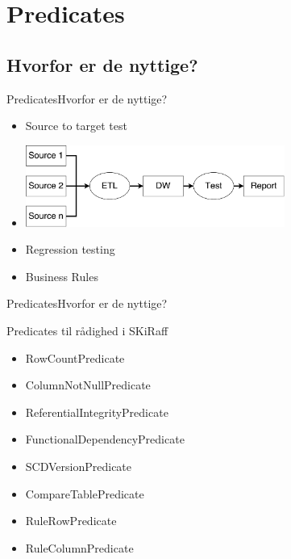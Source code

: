 
\section{Predicates}

\subsection{Hvorfor er de nyttige?}
\begin{frame}{Predicates}{Hvorfor er de nyttige?}
	\begin{itemize}
		\item<2-> Source to target test
		\item<2->[] \includegraphics[width=8.5cm]{figures/scenario.pdf}
		\item<3-> Regression testing
		\item<3-> Business Rules
	\end{itemize}
\end{frame}

\begin{frame}{Predicates}{Hvorfor er de nyttige?}
	\begin{block}{Predicates til rådighed i SKiRaff}
		\begin{itemize}
			\item<1-> RowCountPredicate
			\item<1-> ColumnNotNullPredicate
			\item<1-> ReferentialIntegrityPredicate
			\item<1-> FunctionalDependencyPredicate
			\item<1-> SCDVersionPredicate
			\item<1-> CompareTablePredicate
			\item<1-> RuleRowPredicate
			\item<1-> RuleColumnPredicate
		\end{itemize}
	\end{block}
\end{frame}

